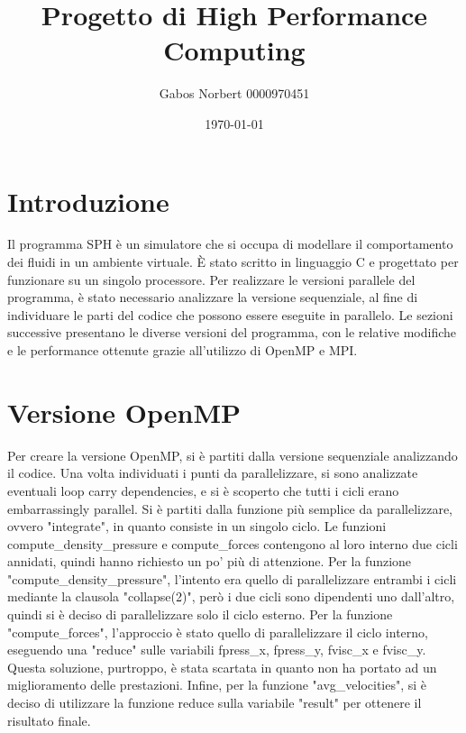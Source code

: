 \documentclass[a4paper,12pt, oneside]{article}
\title{Progetto di High Performance Computing}
\author{Gabos Norbert 0000970451}
\date{\today}
\begin{document}
\maketitle

\section{Introduzione}

Il programma SPH è un simulatore che si occupa di modellare il comportamento dei fluidi in un
ambiente virtuale. È stato scritto in linguaggio C e progettato per funzionare su un singolo
processore. Per realizzare le versioni parallele del programma, è stato necessario analizzare
la versione sequenziale, al fine di individuare le parti del codice che possono essere eseguite
in parallelo. Le sezioni successive presentano le diverse versioni del programma, con le
relative modifiche e le performance ottenute grazie all'utilizzo di OpenMP e MPI.

\section{Versione OpenMP}

Per creare la versione OpenMP, si è partiti dalla versione sequenziale analizzando il codice.
Una volta individuati i punti da parallelizzare, si sono analizzate eventuali loop carry
dependencies, e si è scoperto che tutti i cicli erano embarrassingly parallel. Si è partiti
dalla funzione più semplice da parallelizzare, ovvero "integrate", in quanto consiste in un
singolo ciclo. Le funzioni compute_density_pressure e compute_forces contengono al loro
interno due cicli annidati, quindi hanno richiesto un po' più di attenzione.
Per la funzione "compute_density_pressure", l'intento era quello di parallelizzare entrambi
i cicli mediante la clausola "collapse(2)", però i due cicli sono dipendenti uno dall'altro,
quindi si è deciso di parallelizzare solo il ciclo esterno. Per la funzione "compute_forces",
l'approccio è stato quello di parallelizzare il ciclo interno, eseguendo una "reduce" sulle
variabili fpress_x, fpress_y, fvisc_x e fvisc_y. Questa soluzione, purtroppo, è stata scartata
in quanto non ha portato ad un miglioramento delle prestazioni.
Infine, per la funzione "avg_velocities", si è deciso di utilizzare la funzione reduce sulla
variabile "result" per ottenere il risultato finale.

\end{document}
